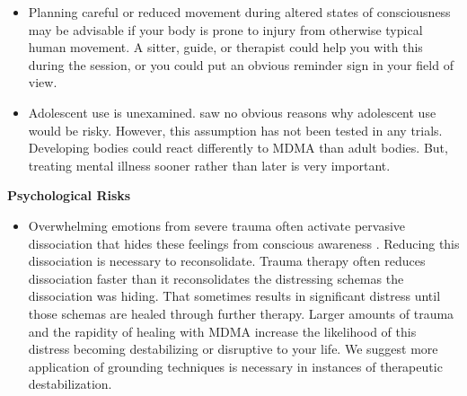 \documentclass[12pt,letterpaper]{book}
\begin{document}
\begin{itemize}
    \item Planning careful or reduced movement during altered states of consciousness may be advisable if your body is prone to injury from otherwise typical human movement. A sitter, guide, or therapist could help you with this during the session, or you could put an obvious reminder sign in your field of view.
    \item Adolescent use is unexamined. \textcite{kangaslampiAdolescent} saw no obvious reasons why adolescent use would be risky. However, this assumption has not been tested in any trials. Developing bodies could react differently to MDMA than adult bodies. But, treating mental illness sooner rather than later is very important.
\end{itemize}
\noindent \textbf{Psychological Risks}
\begin{itemize}
    \item Overwhelming emotions from severe trauma often activate pervasive dissociation that hides these feelings from conscious awareness \cite{razviPSIP}. Reducing this dissociation is necessary to reconsolidate. Trauma therapy often reduces dissociation faster than it reconsolidates the distressing schemas the dissociation was hiding. That sometimes results in significant distress until those schemas are healed through further therapy. Larger amounts of trauma and the rapidity of healing with MDMA increase the likelihood of this distress becoming destabilizing or disruptive to your life. We suggest more application of grounding techniques is necessary in instances of therapeutic destabilization.   

\end{itemize}
\end{document}
